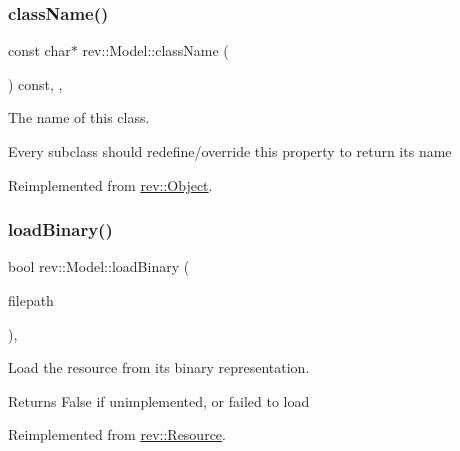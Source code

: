 \subsubsection{\texorpdfstring{className()}{className()}}
{\footnotesize\ttfamily const char$\ast$ rev\+::\+Model\+::class\+Name (\begin{DoxyParamCaption}{ }\end{DoxyParamCaption}) const\hspace{0.3cm}{\ttfamily [inline]}, {\ttfamily [override]}, {\ttfamily [virtual]}}



The name of this class. 

Every subclass should redefine/override this property to return its name 

Reimplemented from \mbox{\hyperlink{classrev_1_1_object_a7a2013f91169479b65cf93afdc5d9a68}{rev\+::\+Object}}.

\mbox{\label{classrev_1_1_model_aa61390d068bc81cd1d28c8bf44c88008}} 
\subsubsection{\texorpdfstring{loadBinary()}{loadBinary()}}
{\footnotesize\ttfamily bool rev\+::\+Model\+::load\+Binary (\begin{DoxyParamCaption}\item[{const \mbox{\hyperlink{classrev_1_1_g_string}{G\+String}} \&}]{filepath }\end{DoxyParamCaption})\hspace{0.3cm}{\ttfamily [override]}, {\ttfamily [virtual]}}



Load the resource from its binary representation. 

\begin{DoxyReturn}{Returns}
False if unimplemented, or failed to load 
\end{DoxyReturn}


Reimplemented from \mbox{\hyperlink{classrev_1_1_resource_aad752eceda9dab7ea282fb50b894ad4c}{rev\+::\+Resource}}.

\mbox{\label{classrev_1_1_model_ab005d0b8d9815c0cfa80a01f46fb8a38}} 
